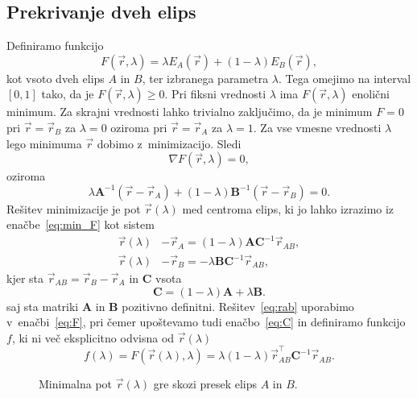 \subsection{Prekrivanje dveh elips}
Definiramo funkcijo
\begin{equation}
    F(\vec{r}, \lambda) = \lambda E_A (\vec{r}) + (1 - \lambda) E_B (\vec{r}),
    \label{eq:F}
\end{equation}
kot vsoto dveh elips $A$ in $B$, ter izbranega parametra $\lambda$. Tega omejimo na
interval $[0,1]$ tako, da je $F(\vec{r}, \lambda) \geq 0$. Pri fiksni vrednosti 
$\lambda$ ima $F(\vec{r}, \lambda)$ enolični minimum. 
Za skrajni vrednosti lahko trivialno zaključimo, da je minimum $F=0$ pri 
$\vec{r} = \vec{r}_B$ za $\lambda=0$ oziroma pri $\vec{r} = \vec{r}_A$ za 
$\lambda=1$. 
Za vse vmesne vrednosti $\lambda$ lego minimuma $\vec{r}$ dobimo z~minimizacijo.
Sledi
\begin{equation}
    \nabla F(\vec{r}, \lambda) = 0,
\end{equation}
oziroma
\begin{equation}
    \lambda \mathbf{A}^{-1} (\vec{r} - \vec{r}_A) + (1-\lambda) \mathbf{B}^{-1}
    (\vec{r} - \vec{r}_B) = 0.
    \label{eq:min_F}
\end{equation}
Rešitev minimizacije je pot $\vec{r}(\lambda)$ med centroma elips, ki jo lahko izrazimo 
iz enačbe~\ref{eq:min_F} kot sistem
\begin{align}
    \vec{r}(\lambda) &- \vec{r}_A = (1-\lambda) \mathbf{A} \mathbf{C}^{-1} 
        \vec{r}_{A B}, \nonumber \\
    \vec{r}(\lambda) &- \vec{r}_B = - \lambda \mathbf{B} \mathbf{C}^{-1} \vec{r}_{A B}, 
    \label{eq:rab}
\end{align}
kjer sta $\vec{r}_{A B} = \vec{r}_B - \vec{r}_A$ in $\mathbf{C}$ vsota
\begin{equation}
    \mathbf{C} = (1-\lambda) \mathbf{A} + \lambda \mathbf{B}.
    \label{eq:C}
\end{equation}
saj sta matriki $\mathbf{A}$ in $\mathbf{B}$ pozitivno 
definitni.
Rešitev~\ref{eq:rab} uporabimo v~enačbi~\ref{eq:F}, pri čemer upoštevamo tudi
enačbo~\ref{eq:C} in definiramo funkcijo $f$, ki ni več eksplicitno odvisna od 
$\vec{r}(\lambda)$
\begin{equation}
    f(\lambda) = F (\vec{r}(\lambda), \lambda) = \lambda (1-\lambda)
        \vec{r}_{A B}^{\top} \mathbf{C}^{-1} \vec{r}_{A B}.
\end{equation}
\begin{figure}[!ht]
    \centering
    \resizebox{.5\textwidth}{!}{}
    \caption{Minimalna pot $\vec{r}(\lambda)$ gre skozi presek elips $A$ in $B$.}
    \label{fig:path}
\end{figure}\\
